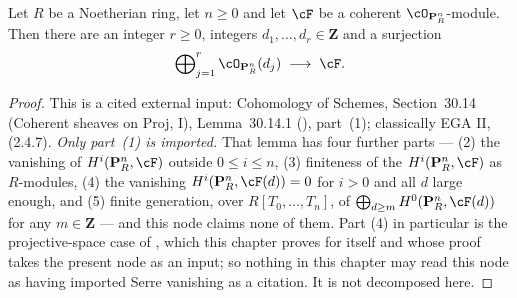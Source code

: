\begin{lemma}
\label{lem:pc-coherent-quotient-of-twists}
Let $R$ be a Noetherian ring, let $n\ge0$ and let $\cF$ be a coherent
$\cO_{\mathbf P^n_R}$-module.  Then there are an integer $r\ge0$,
integers $d_1,\dots,d_r\in\mathbf Z$ and a surjection
\[
\bigoplus\nolimits_{j=1}^{r}\cO_{\mathbf P^n_R}(d_j)
\;\longrightarrow\;\cF .
\]
\end{lemma}
\begin{proof}
This is a cited external input: Cohomology of Schemes, Section~30.14
(Coherent sheaves on Proj, I), Lemma~30.14.1 (),
part~(1); classically EGA II, \,(2.4.7).  \emph{Only part~(1) is
imported.}  That lemma has four further parts --- (2) the vanishing of
$H^i(\mathbf P^n_R,\cF)$ outside $0\le i\le n$, (3) finiteness of the
$H^i(\mathbf P^n_R,\cF)$ as $R$-modules, (4) the vanishing
$H^i(\mathbf P^n_R,\cF(d))=0$ for $i>0$ and all $d$ large enough, and
(5) finite generation, over $R[T_0,\dots,T_n]$, of
$\bigoplus_{d\ge m}H^0(\mathbf P^n_R,\cF(d))$ for any $m\in\mathbf Z$
--- and this node claims
none of them.  Part (4) in particular is the projective-space case of
, which this chapter proves for itself and
whose proof takes the present node as an input; so nothing in this
chapter may read this node as having imported Serre vanishing as a
citation.  It is not decomposed here.
\end{proof}

